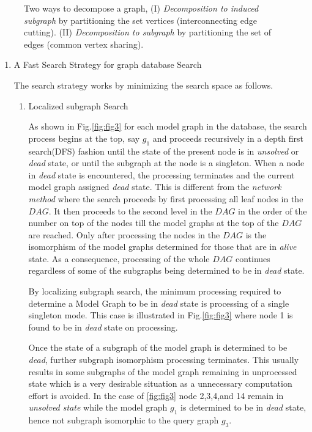 \begin{figure}
\centering

\caption{Two ways to decompose a graph, (I) \textit{Decomposition to induced subgraph} by partitioning the set vertices (interconnecting edge cutting). (II) \textit{Decomposition to subgraph} by partitioning the set of edges (common vertex sharing).}
\label{fig:fig55}
\end{figure}

\begin{enumerate}

\item A Fast Search Strategy for graph database Search

The search strategy works by minimizing the search space as follows.
\begin{enumerate}
\item{Localized subgraph Search}

As shown in Fig.\ref{fig:fig3} for each model graph in the database, the search process begins at the top, say $g_1$ and proceeds recursively in a depth first search(DFS) fashion until the state of the present node is in \textit{unsolved} or \textit{dead} state, or until the subgraph at the node is a singleton. When a node in \textit{dead} state is encountered, the processing terminates and the current model graph assigned \textit{dead} state. This is different from the \textit{network method} where the search proceeds by first processing all leaf nodes in the $DAG$. It then proceeds to the second level in the $DAG$ in the order of the number on top of the nodes till the model graphs at the top of the $DAG$ are reached. Only after processing the nodes in the $DAG$ is the isomorphism of the model graphs determined for those that are in  \textit{alive} state. As a consequence, processing of the whole $DAG$ continues regardless of some of the subgraphs being determined to be in \textit{dead} state.

By localizing subgraph search, the minimum processing required to determine a Model Graph to be in \textit{dead} state is processing of a single singleton mode. This case is illustrated in Fig.\ref{fig:fig3} where node 1 is found to be in \textit{dead} state on processing.


Once the state of a subgraph of the model graph is determined to be \textit{dead}, further subgraph isomorphism processing terminates. This usually results in some subgraphs of the model graph remaining in unprocessed state which is a very desirable situation as a unnecessary computation effort is avoided. In the case of \ref{fig:fig3} node 2,3,4,and 14 remain in \textit{unsolved state} while the model graph $g_1$ is determined to be in \textit{dead} state, hence not subgraph isomorphic to the query graph $g_3$.


\end{enumerate}
\end{enumerate}
